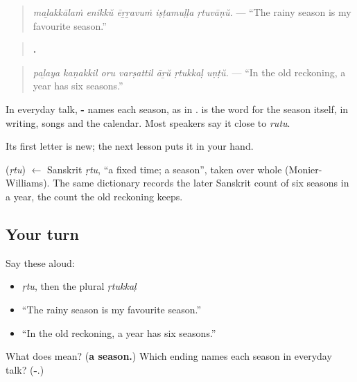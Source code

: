 \begin{quote}
\emph{maḻakkālaṁ enikkŭ ēṟṟavuṁ iṣṭamuḷḷa ṛtuvāṇŭ.} — \textquotedblleft{}The rainy season is my favourite season.\textquotedblright{}
\end{quote}

\begin{quote}
\textbf{      .}
\end{quote}

\begin{quote}
\emph{paḻaya kaṇakkil oru varṣattil āṟŭ ṛtukkaḷ uṇṭŭ.} — \textquotedblleft{}In the old reckoning, a year has six seasons.\textquotedblright{}
\end{quote}

In everyday talk, \textbf{-} names each season, as in \textbf{}. \textbf{} is the word for the season itself, in writing, songs and the calendar. Most speakers say it close to \emph{rutu}.

Its first letter is new; the next lesson puts it in your hand.

\begin{cousinweb}
\textbf{} (\emph{ṛtu}) $\leftarrow$ Sanskrit \emph{ṛtu}, \textquotedblleft{}a fixed time; a season\textquotedblright{}, taken over whole (Monier-Williams). The same dictionary records the later Sanskrit count of six seasons in a year, the count the old reckoning keeps.
\end{cousinweb}

\subsection*{Your turn}
Say these aloud:

\begin{itemize}
\raggedright
  \item \emph{ṛtu}, then the plural \emph{ṛtukkaḷ}
  \item \textquotedblleft{}The rainy season is my favourite season.\textquotedblright{}
  \item \textquotedblleft{}In the old reckoning, a year has six seasons.\textquotedblright{}
\end{itemize}

\begin{tcolorbox}[breakable,colback=teal!4,colframe=teal!35!black,title={Before you move on}]
What does \textbf{} mean? (\textbf{a season.}) Which ending names each season in everyday talk? (\textbf{-}.)
\end{tcolorbox}
